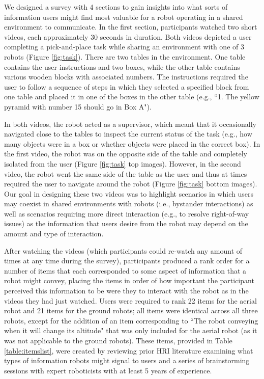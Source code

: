 \documentclass[letterpaper, 10 pt, conference]{ieeeconf}  %
\begin{document}
We designed a survey with 4 sections to gain insights into what sorts of information users might find most valuable for a robot operating in a shared environment to communicate. In the first section, participants watched two short videos, each approximately 30 seconds in duration. Both videos depicted a user completing a pick-and-place task while sharing an environment with one of 3 robots (Figure \ref{fig:task}). There are two tables in the environment. One table contains the user instructions and two boxes, while the other table contains various wooden blocks with associated numbers. The instructions required the user to follow a sequence of steps in which they selected a specified block from one table and placed it in one of the boxes in the other table (e.g., ``1. The yellow pyramid with number 15 should go in Box A"). 
    
In both videos, the robot acted as a supervisor, which meant that it occasionally navigated close to the tables to inspect the current status of the task (e.g., how many objects were in a box or whether objects were placed in the correct box). In the first video, the robot was on the opposite side of the table and completely isolated from the user (Figure \ref{fig:task} top images). However, in the second video, the robot went the same side of the table as the user and thus at times required the user to navigate around the robot (Figure \ref{fig:task} bottom images). Our goal in designing these two videos was to highlight scenarios in which users may coexist in shared environments with robots (i.e., bystander interactions) as well as scenarios requiring more direct interaction (e.g., to resolve right-of-way issues) as the information that users desire from the robot may depend on the amount and type of interaction. %

After watching the videos (which participants could re-watch any amount of times at any time during the survey), participants produced a rank order for a number of items that each corresponded to some aspect of information that a robot might convey, placing the items in order of how important the participant perceived this information to be were they to interact with the robot as in the videos they had just watched. Users were required to rank 22 items for the aerial robot and 21 items for the ground robots; all items were identical across all three robots, except for the addition of an item corresponding to ``The robot conveying when it will change its altitude" that was only included for the aerial robot (as it was not applicable to the ground robots). These items, provided in Table \ref{table:itemslist}, were created by reviewing prior HRI literature examining what types of information robots might signal to users and a series of brainstorming sessions with expert roboticists with at least 5 years of experience.
\end{document}

